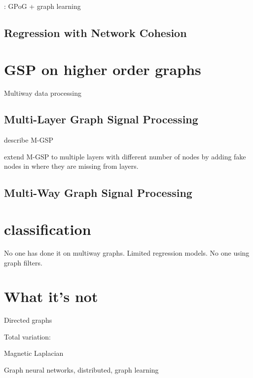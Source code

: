 \cite{Miao2022}: GPoG + graph learning

\subsection{Regression with Network Cohesion}

\cite{Le2022}

\cite{Li2019}

\section{GSP on higher order graphs}

Multiway data processing 

\cite{Smilde2004}
\cite{Kroonenberg2008}


\cite{Ji2019}

\cite{Cammoun2009}




\subsection{Multi-Layer Graph Signal Processing}

\cite{Zhang2022} describe M-GSP 

\cite{Zhang2018} extend M-GSP to multiple layers with different number of nodes by adding fake nodes in where they are missing from layers. 
 

\subsection{Multi-Way Graph Signal Processing}


\cite{Zhao2023}

\cite{Li2012}



\section{classification}

\cite{Tran2020}

No one has done it on multiway graphs. Limited regression models. No one using graph filters. 


\section{What it's not}

Directed graphs  \cite{Chung2005, Bauer2012}

Total variation: \citep{Shafipour2019,Sardellitti2017}

Magnetic Laplacian \citep{DeResende2020,Zhang2021,Furutani2020}

Graph neural networks, distributed, graph learning